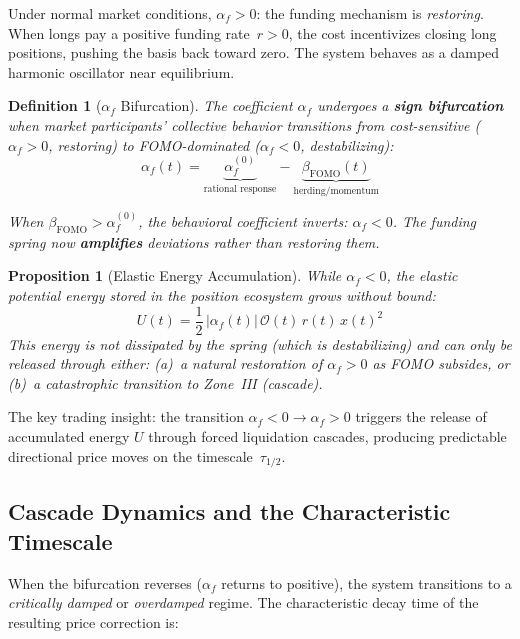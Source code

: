 \documentclass[11pt,a4paper]{article}
\newtheorem{definition}{Definition}[section]
\newtheorem{proposition}{Proposition}[section]
\newcommand{\af}{\alpha_f}
\newcommand{\OI}{\mathcal{O}}
\begin{document}
Under normal market conditions, $\af > 0$: the funding mechanism is 
\emph{restoring}. When longs pay a positive funding rate~$r > 0$, the cost 
incentivizes closing long positions, pushing the basis back toward zero. The 
system behaves as a damped harmonic oscillator near equilibrium.

\begin{definition}[$\af$ Bifurcation]
\label{def:bifurcation}
The coefficient $\af$ undergoes a \textbf{sign bifurcation} when market 
participants' collective behavior transitions from cost-sensitive 
($\af > 0$, restoring) to FOMO-dominated ($\af < 0$, destabilizing):
\begin{equation}
\label{eq:bifurcation}
\af(t) = \underbrace{\af^{(0)}}_{\text{rational response}} 
- \underbrace{\beta_{\mathrm{FOMO}}(t)}_{\text{herding/momentum}}
\end{equation}

When $\beta_{\mathrm{FOMO}} > \af^{(0)}$, the behavioral coefficient inverts: 
$\af < 0$. The funding spring now \textbf{amplifies} deviations rather than 
restoring them.
\end{definition}

\begin{proposition}[Elastic Energy Accumulation]
\label{prop:energy}
While $\af < 0$, the elastic potential energy stored in the position ecosystem 
grows without bound:
\begin{equation}
\label{eq:energy}
U(t) = \frac{1}{2}\,|\af(t)|\,\OI(t)\,r(t)\,x(t)^2
\end{equation}
This energy is not dissipated by the spring (which is destabilizing) and can 
only be released through either: (a)~a natural restoration of $\af > 0$ as 
FOMO subsides, or (b)~a catastrophic transition to Zone~III (cascade).
\end{proposition}

The key trading insight: the transition $\af < 0 \to \af > 0$ triggers the 
release of accumulated energy $U$ through forced liquidation cascades, producing 
predictable directional price moves on the timescale~$\tau_{1/2}$.


\subsection{Cascade Dynamics and the Characteristic Timescale}

When the bifurcation reverses ($\af$ returns to positive), the system 
transitions to a \emph{critically damped} or \emph{overdamped} regime. 
The characteristic decay time of the resulting price correction is:
\end{document}
